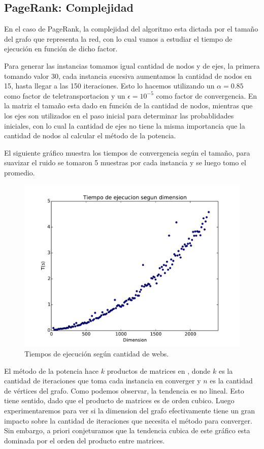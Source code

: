 \subsection{PageRank: Complejidad}

En el caso de PageRank, la complejidad del algoritmo esta dictada por el tamaño del grafo que representa la red, con lo cual vamos a estudiar el tiempo de ejecución en función de dicho factor.

Para generar las instancias tomamos igual cantidad de nodos y de ejes, la primera tomando valor 30, cada instancia sucesiva aumentamos la cantidad de nodos en 15, hasta llegar a las 150 iteraciones. Esto lo hacemos utilizando un $\alpha = 0.85$ como factor de teletransportacion y un $\epsilon = 10^{-5}$ como factor de convergencia. En la matriz el tamaño esta dado en función de la cantidad de nodos, mientras que los ejes son utilizados en el paso inicial para determinar las probablidades iniciales, con lo cual la cantidad de ejes no tiene la misma importancia que la cantidad de nodos al calcular el método de la potencia.

El siguiente gráfico muestra los tiempos de convergencia según el tamaño, para suavizar el ruido se tomaron 5 muestras por cada instancia y se luego tomo el promedio.

\begin{figure}[H]
\centering
\includegraphics[scale=0.7]{images/complejidad.pdf}
\caption{Tiempos de ejecución según cantidad de webs.}
\label{timePageRank}
\end{figure}

El método de la potencia hace $k$ productos de matrices en , donde $k$ es la cantidad de iteraciones que toma cada instancia en converger y $n$ es la cantidad de vértices del grafo. Como podemos observar, la tendencia es no lineal. Esto tiene sentido, dado que el producto de matrices es de orden cubico. Luego experimentaremos para ver si la dimension del grafo efectivamente tiene un gran impacto sobre la cantidad de iteraciones que necesita el método para converger. Sin embargo, a priori conjeturamos que la tendencia cubica de este gráfico esta dominada por el orden del producto entre matrices.